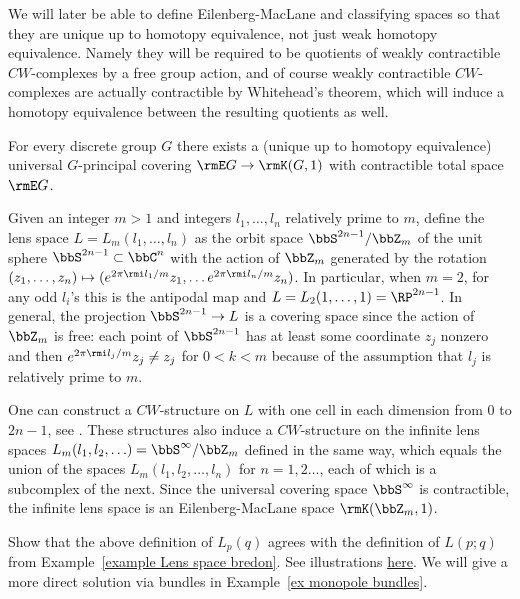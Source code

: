 \begin{rem}
    We will later be able to define Eilenberg-MacLane and classifying spaces so that they are unique up to homotopy equivalence, not just weak homotopy equivalence. Namely they will be required to be quotients of weakly contractible $CW$-complexes by a free group action, and of course weakly contractible $CW$-complexes are actually contractible by Whitehead's theorem, which will induce a homotopy equivalence between the resulting quotients as well.
\end{rem}


\begin{cor}
    For every discrete group $G$ there exists a (unique up to homotopy equivalence) universal $G$-principal covering $\rmE G\to \rmK(G,1)$ with contractible total space $\rmE G$.
\end{cor}

\begin{example}\label{example Lens spaces}
    Given an integer $m>1$ and integers $l_1,\ldots,l_n$ relatively prime to $m$, define the lens space $L=L_m(l_1,\ldots,l_n)$ as the orbit space $\bbS^{2n-1}\slash \bbZ_m$ of the unit sphere $\bbS^{2n-1}\subset\bbC^n$ with the action of $\bbZ_m$ generated by the rotation $(z_1,\ldots,z_n)\mapsto (e^{2\pi\rmi l_1/m}z_1,\ldots e^{2\pi\rmi l_n/m} z_n)$. In particular, when $m=2$, for any odd $l_i$'s this is the antipodal map and $L=L_2(1,\ldots,1)=\RP^{2n-1}$. In general, the projection $\bbS^{2n-1}\to L$ is a covering space since the action of $\bbZ_m$ is free: each point of $\bbS^{2n-1}$ has at least some coordinate $z_j$ nonzero and then $e^{2\pi\rmi l_j/m}z_j\neq z_j$ for $0<k<m$ because of the assumption that $l_j$ is relatively prime to $m$.

    One can construct a $CW$-structure on $L$ with one cell in each dimension from $0$ to $2n-1$, see \cite[Example~2.43]{Hatcher}. These structures also induce a $CW$-structure on the infinite lens spaces $L_m(l_1,l_2,\ldots)=\bbS^\infty\slash \bbZ_m$ defined in the same way, which equals the union of the spaces $L_m(l_1,l_2,\ldots,l_n)$ for $n=1,2\ldots$, each of which is a subcomplex of the next. Since the universal covering space $\bbS^\infty$ is contractible, the infinite lens space is an Eilenberg-MacLane space $\rmK(\bbZ_m,1)$.
\end{example}


\begin{xca}\label{xca two definitions of lens spaces}
    Show that the above definition of $L_p(q)$ agrees with the definition of $L(p;q)$ from Example~\ref{example Lens space bredon}. See illustrations \href{https://math.stackexchange.com/a/1186808/31363}{here}. We will give a more direct solution via bundles in Example~\ref{ex monopole bundles}.
\end{xca}










